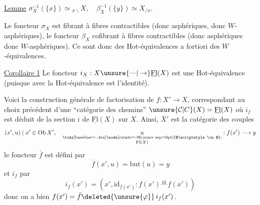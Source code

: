 
\uline{Lemme}  $\sigma_X^{-1}(\{x\})\simeq{}_{x\backslash}X,\quad \beta_X^{-1}(\{y\})\simeq X_{/x}$. 

Le foncteur $\sigma_X$ est fibrant à fibres  contractibles (donc asphériques, donc $W$-asphériques), le foncteur $\beta_X$ cofibrant à fibres contractibles (donc asphériques donc $W$-asphériques). Ce sont donc  des Hot-équivalences a fortiori des $W$-équivalences.

\uline{Corollaire 1} Le foncteur $i_X:X\unsure{\text{---}|\to}\underline{\mathrm{Fl}}(X)$ est une Hot-équivalence (puisque  avec la Hot-équivalence  est l'identité).

Voici la construction générale de factorisation de $f:X'\longrightarrow X$, correspondant au choix précédent d'une ``catégorie des chemins'' $\unsure{\mathcal C|C}(X)=\underline{\mathrm{Fl}}(X)$
où $i_f$ est déduit de la section $i$ de $\underline{\mathrm{Fl}}(X)$ sur $X$. Ainsi, $\overline{X}'$ est la catégorie des couples
\[ (x',u)\mid x'\in\operatorname{Ob}X',\quad \underset{\substack{\text{\tikz[baseline=-.4ex]\node[rotate=-90,inner sep=0pt] {$\scriptstyle\in$};}\\\mathrm{Fl}(X)}}{u}:f(x')\longrightarrow y \]
le foncteur $\bar f$ est défini par
\[ \bar f(x',u)=\mathrm{but}(u)=y \]
et $i_f$ par
\[ i_f(x')=(x',\mathrm{id}_{f(x')}:f(x')\overset{\mathrm{id}}{\text{---}} f(x')) \]
donc on a bien $f(x')=\bar f\deleted{\unsure{\varphi}}\,i_f(x')$.

